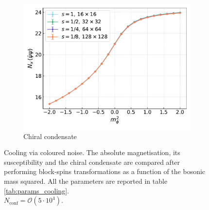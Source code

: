 \begin{figure}[hbp]
\begin{subfigure}[b]{0.47\textwidth}
        \includegraphics[width=\textwidth]{figures/cooling/mass_scan/condensate.pdf}
        \caption{Chiral condensate}
    \end{subfigure}
    \caption[Cooling stochastic quantisation: fields as a function of the bosonic mass squared.]{Cooling via coloured noise. The absolute magnetisation, its susceptibility and the chiral condensate are compared after performing block-spins transformations as a function of the bosonic mass squared. All the parameters are reported in table \ref{tab:params_cooling}. \\ $N_\text{conf} = \mathcal{O}(5 \cdot 10^4)$.}
    \label{fig:cooling_M_psibarpsi_chi2}
\end{figure}

